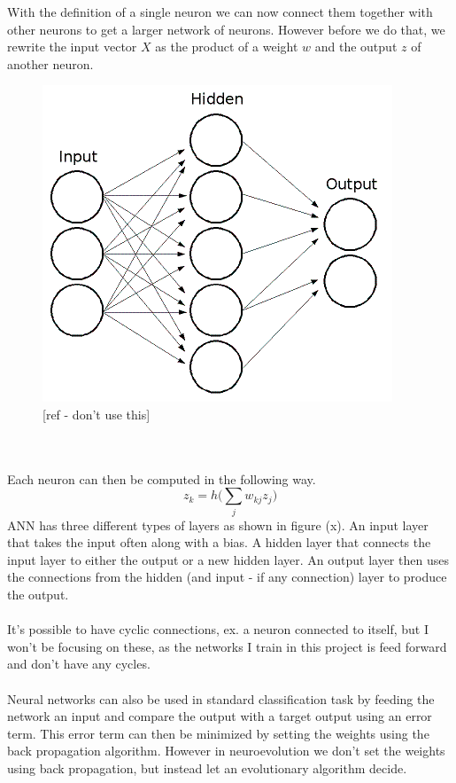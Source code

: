 With the definition of a single neuron we can now connect them together with other neurons to get a larger network of neurons. However before we do that, we rewrite the input vector $ X $ as the product of a weight $ w $ and the output $ z $ of another neuron.
\begin{figure}[!ht]
\centering
\includegraphics[scale=0.7]{NeuralNetwork}
\caption{[ref - don't use this]}
\end{figure}
\\
\\
Each neuron can then be computed in the following way.
\begin{equation}
z_k = h\Big(\sum\limits_{j}{w_{kj} z_j}\Big)
\end{equation}
ANN has three different types of layers as shown in figure (x). An input layer that takes the input often along with a bias. A hidden layer that connects the input layer to either the output or a new hidden layer. An output layer then uses the connections from the hidden (and input - if any connection) layer to produce the output. 
\\
\\
It's possible to have cyclic connections, ex. a neuron connected to itself, but I won't be focusing on these, as the networks I train in this project is feed forward and don't have any cycles. 
\\
\\
Neural networks can also be used in standard classification task by feeding the network an input and compare the output with a target output using an error term. This error term can then be minimized by setting the weights using the back propagation algorithm. However in neuroevolution we don't set the weights using back propagation, but instead let an evolutionary algorithm decide.
